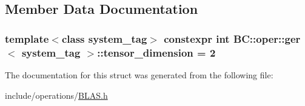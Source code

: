 \subsection{Member Data Documentation}
\subsubsection[{\texorpdfstring{tensor\+\_\+dimension}{tensor_dimension}}]{\setlength{\rightskip}{0pt plus 5cm}template$<$class system\+\_\+tag$>$ constexpr int {\bf B\+C\+::oper\+::ger}$<$ system\+\_\+tag $>$\+::tensor\+\_\+dimension = 2\hspace{0.3cm}{\ttfamily [static]}}\hypertarget{structBC_1_1oper_1_1ger_aea73977f252736f0d2b20fe3ae5361bb}{}\label{structBC_1_1oper_1_1ger_aea73977f252736f0d2b20fe3ae5361bb}


The documentation for this struct was generated from the following file\+:\begin{DoxyCompactItemize}
\item 
include/operations/\hyperlink{operations_2BLAS_8h}{B\+L\+A\+S.\+h}\end{DoxyCompactItemize}
